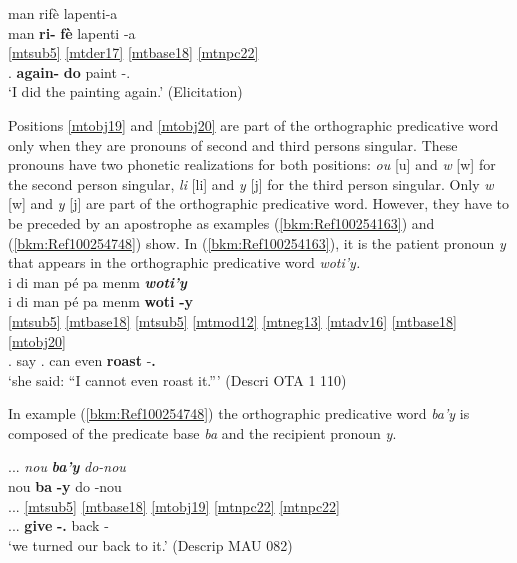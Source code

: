 \documentclass[output=paper]{langscibook}
\begin{document}
\ea\label{bkm:Ref105162940}
\gllll man rifè lapenti-a\\
man \textbf{ri-} \textbf{fè} lapenti -a\\ 
\ref{mtsub5} \ref{mtder17} \ref{mtbase18} \ref{mtnpc22} \\
\First\Sg.\Sarg{} \textbf{again-} \textbf{do} paint -\Def.\Art{}\\
\glt `I did the painting again.' (Elicitation)
\z


Positions \ref{mtobj19} and \ref{mtobj20} are part of the orthographic predicative word only when they are pronouns of second and third persons singular. These pronouns have two phonetic realizations for both positions: \textit{ou} [u] and \textit{w} [w] for the second person singular, \textit{li} [li] and \textit{y} [j] for the third person singular. Only \textit{w} [w] and \textit{y} [j] are part of the orthographic predicative word. However, they have to be preceded by an apostrophe as examples (\ref{bkm:Ref100254163}) and (\ref{bkm:Ref100254748}) show. In (\ref{bkm:Ref100254163}), it is the patient pronoun \textit{y} that appears in the orthographic predicative word \textit{woti’y.}\\


\ea\label{bkm:Ref100254163} 
i di man pé pa menm \textbf{\textit{woti'y}}\\
\glll i di man pé pa menm \textbf{woti} \textbf{-y}\\
\ref{mtsub5} \ref{mtbase18} \ref{mtsub5} \ref{mtmod12} \ref{mtneg13} \ref{mtadv16} \ref{mtbase18} \ref{mtobj20} \\
\Third\Sg.\Sarg{} say \First\Sg.\Sarg{} can \Neg{} even \textbf{roast} -\textbf{\Third\Sg.\Obj{}}\\
\glt `she\protect\footnotemark{} said: ``I cannot even roast it.''' (Descri OTA 1 110)
\z


In example (\ref{bkm:Ref100254748}) the orthographic predicative word \textit{ba’y} is composed of the predicate base \textit{ba} and the recipient pronoun \textit{y}.

\ea\label{bkm:Ref100254748}
{...} \textit{nou} \textbf{\textit{ba'y}} \textit{do-nou}\\
 nou \textbf{ba} \textbf{-y} do -nou\\
{...} \ref{mtsub5} \ref{mtbase18} \ref{mtobj19} \ref{mtnpc22} \ref{mtnpc22} \\
{...} \First\Pl{} \textbf{give} \textbf{-}\textbf{\Third\Sg.\Obj{}} back -\First\Pl{}\\
\glt `we turned our back to it.' (Descrip MAU 082)
\z
\end{document}
